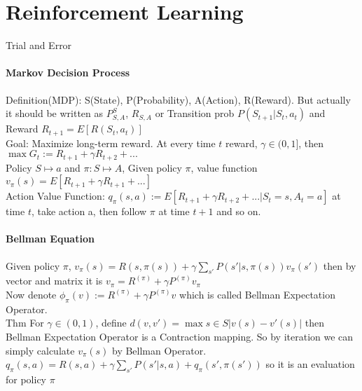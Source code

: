 \documentclass{article}
\begin{document}
\section{Reinforcement Learning}
Trial and Error
\paragraph{Markov Decision Process}
Definition(MDP): S(State), P(Probability), A(Action), R(Reward). But actually it should be written as $P_{S,A}^S$, $R_{S,A}$ or Transition prob $P(S_{t+1}|S_t,a_t)$ and Reward $R_{t+1}=E[R(S_t,a_t)]$\\
Goal: Maximize long-term reward.  At every time $t$ reward, $\gamma\in(0,1]$, then $\max G_t:=R_{t+1}+\gamma R_{t+2}+...$\\
Policy $S\mapsto a$ and $\pi:S\mapsto A$, Given policy $\pi$, value function $v_\pi(s)=E[R_{t+1}+\gamma R_{t+1}+...]$\\
Action Value Function: $q_\pi(s,a):=E[R_{t+1}+\gamma R_{t+2}+...|S_t=s,A_t=a]$ at time $t$, take action a, then follow $\pi$ at time $t+1$ and so on.
\paragraph{Bellman Equation}
Given policy $\pi$, $v_\pi(s)=R(s,\pi(s))+\gamma\sum_{s'}P(s'|s,\pi(s))v_\pi(s')$ then by vector and matrix it is $v_\pi=R^{(\pi)}+\gamma P^{(\pi)}v_\pi$\\
Now denote $\phi_\pi(v):=R^{(\pi)}+\gamma P^{(\pi)}v$ which is called Bellman Expectation Operator.\\
Thm For $\gamma\in(0,1)$, define $d(v,v')=\max\limits{s\in S}|v(s)-v'(s)|$ then Bellman Expectation Operator is a Contraction mapping. So by iteration we can simply calculate $v_\pi(s)$ by Bellman Operator.\\
$q_\pi(s,a)=R(s,a)+\gamma\sum_{s'}P(s'|s,a)+q_\pi(s',\pi(s'))$ so it is an evaluation for policy $\pi$
\end{document}
